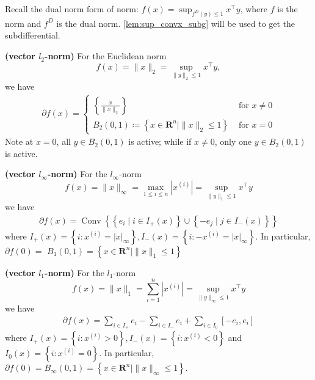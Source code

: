 \documentclass{article}
\newcommand{\bfs}[1]{\textbf{({#1}) }}
\begin{document}
Recall the dual norm form of norm: $f(x)=\sup_{f^D(y)\le 1} x^\top y$, where $f$ is the norm and $f^D$ is the dual norm. \cref{lem:sup_convx_subg} will be used to get the subdifferential.

\begin{exma}\bfs{vector $l_{2}$-norm}
For the Euclidean norm $$f(x)=\|x\|_2=\sup_{\|y\|_2\le 1} x^\top y,$$ we have
\begin{align*}
\partial f(x)= \begin{cases}\left\{\frac{x}{\|x\|_2}\right\} & \text { for } x \neq 0 \\ B_{2}(0,1)\coloneqq\left\{x \in \mathbf{R}^{n}\mid\| x \|_2 \leq 1\right\} & \text { for }  x=0\end{cases}
\end{align*}
Note at $x=0$, all $y\in B_{2}(0,1)$ is active; while if $x\ne 0$, only one $y\in B_{2}(0,1)$ is active.
\end{exma}
\begin{exma}\bfs{vector $l_{\infty}$-norm}
For the $l_{\infty}$-norm $$f(x)=\|x\|_{\infty}=\max _{1 \leq i \leq n}\left|x^{(i)}\right|=\sup_{\|y\|_1\le 1} x^\top y$$ we have
\begin{align*}
\partial f(x)=\operatorname{Conv}\left\{\left\{e_{i} \mid i \in I_{+}(x)\right\} \cup\left\{-e_{j} \mid j \in I_{-}(x)\right\}\right\}
\end{align*}
where $I_{+}(x)=\left\{i: x^{(i)}=|x|_{\infty}\right\}, I_{-}(x)=\left\{i:-x^{(i)}=|x|_{\infty}\right\} .$ In particular, $\partial f(0)=$ $B_{1}(0,1)=\left\{x \in \mathbf{R}^{n}\mid  \|x\|_{1} \leq 1\right\}$
\end{exma}
\begin{exma}\bfs{vector $l_{1}$-norm}
For the $l_{1}$-norm $$f(x)=\|x\|_{1}=\sum_{i=1}^{n}\left|x^{(i)}\right|=\sup_{\|y\|_{\infty}\le 1} x^\top y$$ we have
\begin{align*}
\partial f(x)=\sum_{i \in I_{+}} e_{i}-\sum_{i \in I_{-}} e_{i}+\sum_{i \in I_{0}}\left[-e_{i}, e_{i}\right]
\end{align*}
where $I_{+}(x)=\left\{i: x^{(i)}>0\right\}, I_{-}(x)=\left\{i: x^{(i)}<0\right\}$ and $I_{0}(x)=\left\{i: x^{(i)}=0\right\} .$ In particular, $\partial f(0)=B_{\infty}(0,1)=\left\{x \in \mathbf{R}^{n}\mid \| x\|_{\infty} \leq 1\right\}$.
\end{exma}
\end{document}
